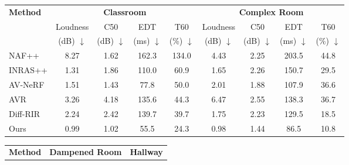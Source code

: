 \documentclass[letterpaper]{article} %
\begin{document}
\begin{table*}[ht!]
    \centering
   \begin{tabular}{l cccc cccc}
    \toprule
   \multirow{3}{*}{\textbf{Method}}   &\multicolumn{4}{c}{\bfseries Classroom}&\multicolumn{4}{c}{\bfseries Complex Room} \\
     \cmidrule(lr){2-5}
     \cmidrule(lr){6-9}
    
         &Loudness & C50 & EDT & T60 &Loudness & C50 & EDT & T60   \\
        & (dB) $\downarrow$ & (dB) $\downarrow$ & (ms) $\downarrow$ & (\%) $\downarrow$ & (dB) $\downarrow$ & (dB) $\downarrow$ & (ms) $\downarrow$ & (\%) $\downarrow$ \\
         \midrule
        NAF++ \cite{luo2022learning} & 8.27 & 1.62 & 162.3 & 134.0 & 4.43 & 2.25 & 203.5 & 44.8 \\  
        INRAS++ \cite{su2022inras} &\cellcolor{lemonchiffon} 1.31 & 1.86 & 110.0 & 60.9 & \cellcolor{lemonchiffon}1.65 & 2.26 & 150.7 & 29.5 \\
        AV-NeRF\cite{liang23avnerf} & 1.51 &  \cellcolor{lemonchiffon}1.43 &\cellcolor{lemonchiffon} 77.8 & 50.0 & 2.01& \cellcolor{lemonchiffon}1.88 & \cellcolor{lemonchiffon}107.9 & 36.6\\
        AVR \cite{avr} & 3.26 & 4.18 & 135.6 & 44.3 & 6.47 & 2.55 & 138.3 & 36.7 \\
        Diff-RIR \cite{hearinganythinganywhere2024} & 2.24 & 2.42 & 139.7 & \cellcolor{lemonchiffon}39.7 & 1.75 & 2.23 & 129.5 & \cellcolor{lemonchiffon}18.5 \\
        \midrule
        Ours& \cellcolor{grannysmithapple}0.99 & \cellcolor{grannysmithapple}1.02 &\cellcolor{grannysmithapple} 55.5 & \cellcolor{grannysmithapple}24.3 & \cellcolor{grannysmithapple}0.98 & \cellcolor{grannysmithapple}1.44 & \cellcolor{grannysmithapple}86.5 & \cellcolor{grannysmithapple}10.8 \\
        \bottomrule
    \end{tabular}
\vspace{0.05in}
    \begin{tabular}{l cccc cccc}
    \toprule
    \multirow{3}{*}{\textbf{Method}} &\multicolumn{4}{c}{\bfseries Dampened Room}&\multicolumn{4}{c}{\bfseries  Hallway} \\
     \cmidrule(lr){2-5}
     \cmidrule(lr){6-9}
    

\end{tabular}
\end{table*}
\end{document}
